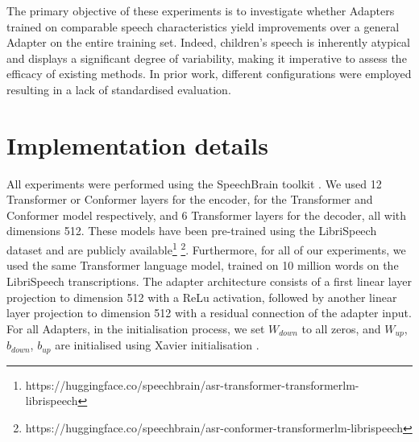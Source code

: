 The primary objective of these experiments is to investigate whether Adapters trained on comparable speech characteristics yield improvements over a general Adapter on the entire training set. Indeed,
children's speech is inherently atypical and displays a significant degree of variability, making it imperative to assess the efficacy of existing methods. In prior work, different configurations were employed resulting in a lack of standardised evaluation.

\section{Implementation details}

All experiments were performed using the SpeechBrain toolkit \cite{speechbrain}. We used  12 Transformer or Conformer layers for the encoder, for the Transformer and Conformer model respectively, and 6 Transformer layers for the decoder, all with dimensions 512. These models have been pre-trained using the LibriSpeech dataset \cite{librispeech} and are publicly available\footnote{https://huggingface.co/speechbrain/asr-transformer-transformerlm-librispeech} \footnote{https://huggingface.co/speechbrain/asr-conformer-transformerlm-librispeech}. Furthermore, for all of our experiments, we used the same Transformer language model, trained on 10 million words 
on the LibriSpeech transcriptions.
The adapter architecture consists of a  first linear layer projection to dimension 512 with a ReLu activation, followed by another linear layer projection to dimension 512 with a residual connection of the adapter input. For all Adapters, in the initialisation process, we set $W_{down}$ to all zeros, and $W_{up}$, $b_{down}$, $b_{up}$ are initialised using Xavier initialisation \cite{glorot2010understanding}.


